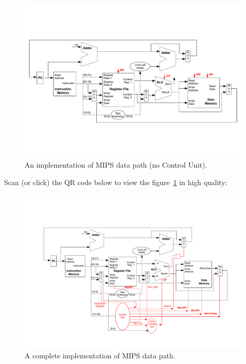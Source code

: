 \documentclass[a4paper]{article}
\begin{document}
    \begin{figure}[!htp]
        \centering
        \includegraphics[width=\textwidth]{img/implementation-mips-datapath.pdf}
        \caption{An implementation of MIPS data path (no Control Unit).\cite{pipelining-slides}}
        \label{fig: implementation of MIPS data path (no Control Unit)}
    \end{figure}

    \newpage

    \noindent
    Scan (or click) the QR code below to view the figure~\ref{fig: implementation of MIPS data path (no Control Unit)} in high quality:
    \begin{center}
    \end{center}

    \begin{figure}[!htp]
        \centering
        \includegraphics[width=\textwidth]{img/implementation-mips-datapath-cu.pdf}
        \caption{A complete implementation of MIPS data path.\cite{pipelining-slides}}
        \label{fig: complete implementation of MIPS data path}
    \end{figure}
\end{document}
